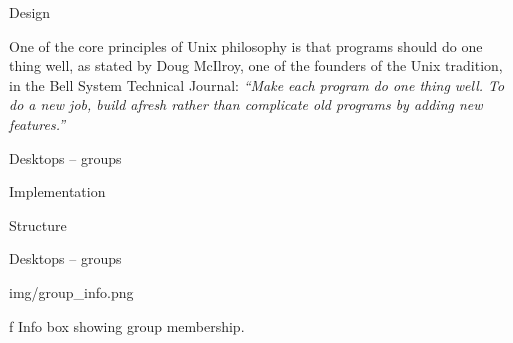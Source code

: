 \sec Design %

One of the core principles of Unix philosophy is that programs should do one thing well,
as stated by Doug McIlroy, one of the founders of the Unix tradition, in the Bell System Technical Journal:
{\em ``Make each program do one thing well.
To do a new job, build afresh rather than complicate old programs by adding new features.''}

\secc Desktops -- groups %

\sec Implementation %

\secc Structure %

\secc Desktops -- groups %

\midinsert
\picw=10cm \cinspic img/group_info.png
\caption/f Info box showing group membership.
\endinsert

